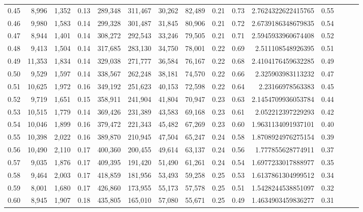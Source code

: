 \begin{tabular}{rrrrrrrrrrrrrrr}
0.45 &   8,996 &  1,352 &  0.13 &  289,348 &  311,467 &   30,262 &   82,489 &  0.21 &  0.73 &    2.7624322622415765 &      0.55 \\
0.46 &   9,980 &  1,583 &  0.14 &  299,328 &  301,487 &   31,845 &   80,906 &  0.21 &  0.72 &    2.6739186348679835 &      0.54 \\
0.47 &   8,944 &  1,401 &  0.14 &  308,272 &  292,543 &   33,246 &   79,505 &  0.21 &  0.71 &    2.5945933960674408 &      0.52 \\
0.48 &   9,413 &  1,504 &  0.14 &  317,685 &  283,130 &   34,750 &   78,001 &  0.22 &  0.69 &     2.511108548926395 &      0.51 \\
0.49 &  11,353 &  1,834 &  0.14 &  329,038 &  271,777 &   36,584 &   76,167 &  0.22 &  0.68 &    2.4104176459632285 &      0.49 \\
0.50 &   9,529 &  1,597 &  0.14 &  338,567 &  262,248 &   38,181 &   74,570 &  0.22 &  0.66 &     2.325903983113232 &      0.47 \\
0.51 &  10,625 &  1,972 &  0.16 &  349,192 &  251,623 &   40,153 &   72,598 &  0.22 &  0.64 &      2.23166978563383 &      0.45 \\
0.52 &   9,719 &  1,651 &  0.15 &  358,911 &  241,904 &   41,804 &   70,947 &  0.23 &  0.63 &    2.1454709936053784 &      0.44 \\
0.53 &  10,515 &  1,779 &  0.14 &  369,426 &  231,389 &   43,583 &   69,168 &  0.23 &  0.61 &     2.052212397229293 &      0.42 \\
0.54 &  10,046 &  1,899 &  0.16 &  379,472 &  221,343 &   45,482 &   67,269 &  0.23 &  0.60 &    1.9631134091937101 &      0.40 \\
0.55 &  10,398 &  2,022 &  0.16 &  389,870 &  210,945 &   47,504 &   65,247 &  0.24 &  0.58 &    1.8708924976275154 &      0.39 \\
0.56 &  10,490 &  2,110 &  0.17 &  400,360 &  200,455 &   49,614 &   63,137 &  0.24 &  0.56 &     1.777855628774911 &      0.37 \\
0.57 &   9,035 &  1,876 &  0.17 &  409,395 &  191,420 &   51,490 &   61,261 &  0.24 &  0.54 &    1.6977233017888977 &      0.35 \\
0.58 &   9,464 &  2,003 &  0.17 &  418,859 &  181,956 &   53,493 &   59,258 &  0.25 &  0.53 &    1.6137861304999512 &      0.34 \\
0.59 &   8,001 &  1,680 &  0.17 &  426,860 &  173,955 &   55,173 &   57,578 &  0.25 &  0.51 &    1.5428244538851097 &      0.32 \\
0.60 &   8,945 &  1,907 &  0.18 &  435,805 &  165,010 &   57,080 &   55,671 &  0.25 &  0.49 &    1.4634903459836277 &      0.31 \\

\end{tabular}
